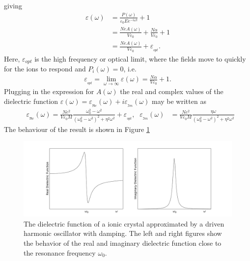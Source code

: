giving
\begin{align}
   \varepsilon (\omega) &= \frac{P(\omega)}{\varepsilon_0 E e^{-i \omega t}} + 1  \\
                        &= \frac{NeA(\omega)}{V\varepsilon_0} + \frac{N \alpha}{V \varepsilon_0} + 1 \\
                        &= \frac{NeA(\omega)}{V\varepsilon_0} + \varepsilon\!_{_{opt}}.
\end{align}
Here, $\varepsilon_{opt}$ is the high frequency or optical limit, where the fields move to quickly for the 
ions to respond and $P_i(\omega) = 0$, i.e.
\begin{align}
   \varepsilon\!_{_{opt}} = \lim_{\omega\to\infty}\varepsilon (\omega)  
   = \frac{N \alpha}{V \varepsilon_0} + 1.
\end{align}
Plugging in the expression for $A(\omega)$ the real and complex values of the dielectric function 
$\varepsilon (\omega) = \varepsilon\!_{_{\Re\! e}} \!\! (\omega) + i \varepsilon\!_{_{\Im\! m}} \!\! (\omega)$ may be
written as
\begin{align}
   &\varepsilon\!_{_{\Re\! e}} \!\! (\omega)  = \frac{Ne^2}{V\varepsilon_0 M} 
   \frac{\omega_0^2 - \omega^2}{(\omega_0^2-\omega^2)^2 + \eta^2 \omega^2} + \varepsilon\!_{_{opt}}
   \text{,}
   &\varepsilon\!_{_{\Im \! m }} \!\! (\omega)  &= \frac{Ne^2}{V\varepsilon_0 M} 
   \frac{\eta \omega}{(\omega_0^2-\omega^2)^2 + \eta^2 \omega^2} 
\end{align}
The behaviour of the result is shown in Figure \ref{fig:dielectricResonance}
%
\begin{figure}[h!]
  \centering
   \includegraphics[width=1.0\textwidth]{../Figures/dielectricResonance.pdf}
   \caption{
      The dielectric function of a ionic crystal approximated by
      a driven harmonic oscillator with damping. The left and right figures show the behavior
      of the real and imaginary dielectric function close to
      the resonance frequency $\omega_0$.
   }
   \label{fig:dielectricResonance}
\end{figure}
